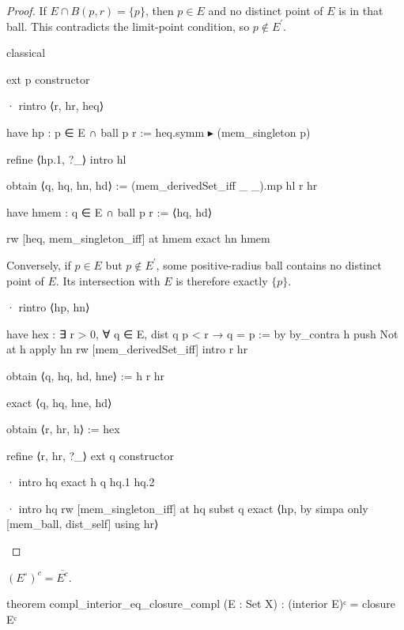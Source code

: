 \begin{proof}
  If $E\cap B(p,r)=\{p\}$, then $p\in E$ and no distinct point of $E$ is in that ball.
  This contradicts the limit-point condition, so $p\notin E^{\prime}$.

  \begin{lean}
    classical

    ext p
    constructor

    · rintro ⟨r, hr, heq⟩

      have hp : p ∈ E ∩ ball p r := heq.symm ▸ (mem_singleton p)

      refine ⟨hp.1, ?_⟩
      intro hl

      obtain ⟨q, hq, hn, hd⟩ := (mem_derivedSet_iff _ _).mp hl r hr

      have hmem : q ∈ E ∩ ball p r := ⟨hq, hd⟩

      rw [heq, mem_singleton_iff] at hmem
      exact hn hmem
  \end{lean}

  Conversely, if $p\in E$ but $p\notin E^{\prime}$, some positive-radius ball contains no distinct
  point of $E$.
  Its intersection with $E$ is therefore exactly $\{p\}$.

  \begin{lean}
    · rintro ⟨hp, hn⟩

      have hex : ∃ r > 0, ∀ q ∈ E, dist q p < r → q = p := by
        by_contra h
        push Not at h
        apply hn
        rw [mem_derivedSet_iff]
        intro r hr

        obtain ⟨q, hq, hd, hne⟩ := h r hr

        exact ⟨q, hq, hne, hd⟩

      obtain ⟨r, hr, h⟩ := hex

      refine ⟨r, hr, ?_⟩
      ext q
      constructor

      · intro hq
        exact h q hq.1 hq.2

      · intro hq
        rw [mem_singleton_iff] at hq
        subst q
        exact ⟨hp, by simpa only [mem_ball, dist_self] using hr⟩
  \end{lean}

\end{proof}

\begin{lemma}
  \label{an1:lem:complement-of-interior-is-closure-of-complement}
  $(E^{\circ})^{c}=\overline{E^{c}}$.

  \begin{lean}
    theorem compl_interior_eq_closure_compl (E : Set X) :
        (interior E)ᶜ = closure Eᶜ
  \end{lean}
\end{lemma}

